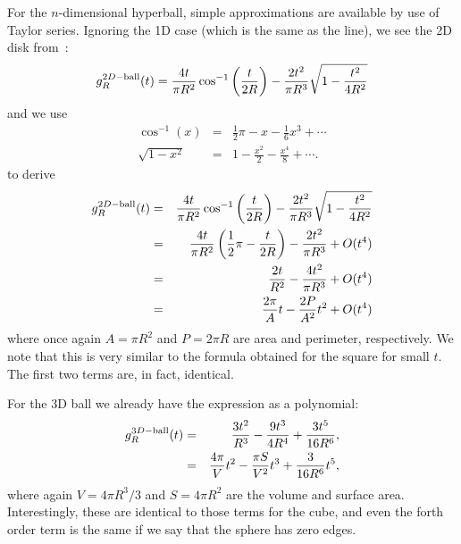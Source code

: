 \documentclass{article}
\begin{document}
For the $n$-dimensional hyperball, simple approximations are available
by use of Taylor series. Ignoring the 1D case (which is the same as
the line), we see the 2D disk
from~\cite{tu00:_circle_line,weisstein:_circle_line_picking}: 
\[
   g^{2D-{\rm ball}}_R(t) 
     =  \frac{4 t}{\pi R^2} \cos^{-1} \left( \frac{t}{2R} \right) 
               - \frac{2 t^2}{\pi R^3} \sqrt{1 - \frac{t^2}{4 R^2} }          
\]
and we use
\begin{eqnarray*}
  \cos^{-1}(x)  & = & \frac{1}{2} \pi - x - \frac{1}{6} x^{3} + \cdots \\
  \sqrt{1 - x^2} & = & 1 - \frac{x^2}{2} - \frac{x^4}{8}  + \cdots.
\end{eqnarray*}
to derive
\begin{eqnarray}
  g^{2D-{\rm ball}}_R(t) 
         & = & \frac{4 t}{\pi R^2} \cos^{-1} \left( \frac{t}{2R} \right) 
               - \frac{2 t^2}{\pi R^3} \sqrt{1 - \frac{t^2}{4 R^2} }
               \nonumber \\
         & = & \frac{4 t}{\pi R^2} \left( \frac{1}{2} \pi - \frac{t}{2R} \right)
                   -  \frac{2 t^2}{\pi R^3} + O(t^4)  \nonumber \\
         & = &  \frac{2 t}{R^2} -  \frac{4 t^2}{\pi R^3}  + O(t^4) \nonumber \\
         & = &  \frac{2 \pi}{A} t -  \frac{2 P}{A^2} t^2 + O(t^4) 
\end{eqnarray}
where once again $A=\pi R^2$ and $P = 2 \pi R$ are area and perimeter,
respectively. We note that this is very similar to the formula
obtained for the square for small $t$. The first two terms are, in
fact, identical.

For the 3D ball we already have the expression as a polynomial:
\begin{eqnarray}
  g^{3D-{\rm ball}}_R(t) 
        & = & \frac{3 t^2}{R^3} - \frac{9 t^3}{4 R^4} + \frac{3 t^5}{16 R^6}  \nonumber , \\
        & = & \frac{4 \pi}{V} t^2 - \frac{\pi S}{V^2} t^3 + \frac{3}{16 R^6} t^5,
\end{eqnarray}
where again $V=4 \pi R^3/3$ and $S = 4 \pi R^2$ are the volume and
surface area. Interestingly, these are identical to those terms for
the cube, and even the forth order term is the same if we say that the
sphere has zero edges.
\end{document}
